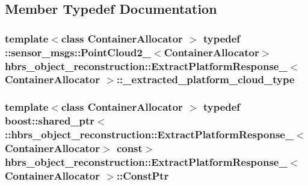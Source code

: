 \subsection{\-Member \-Typedef \-Documentation}
\hypertarget{structhbrs__object__reconstruction_1_1_extract_platform_response___a56a71ac31222bb75042448fdcaaf0e9a}{
\subsubsection[{\-\_\-extracted\-\_\-platform\-\_\-cloud\-\_\-type}]{\setlength{\rightskip}{0pt plus 5cm}template$<$class Container\-Allocator $>$ typedef \-::sensor\-\_\-msgs\-::\-Point\-Cloud2\-\_\-$<$\-Container\-Allocator$>$ {\bf hbrs\-\_\-object\-\_\-reconstruction\-::\-Extract\-Platform\-Response\-\_\-}$<$ \-Container\-Allocator $>$\-::{\bf \-\_\-extracted\-\_\-platform\-\_\-cloud\-\_\-type}}}\label{structhbrs__object__reconstruction_1_1_extract_platform_response___a56a71ac31222bb75042448fdcaaf0e9a}
\hypertarget{structhbrs__object__reconstruction_1_1_extract_platform_response___a8f2d74204a95c1817d4e69f026590159}{
\subsubsection[{\-Const\-Ptr}]{\setlength{\rightskip}{0pt plus 5cm}template$<$class Container\-Allocator $>$ typedef boost\-::shared\-\_\-ptr$<$ \-::{\bf hbrs\-\_\-object\-\_\-reconstruction\-::\-Extract\-Platform\-Response\-\_\-}$<$\-Container\-Allocator$>$ const$>$ {\bf hbrs\-\_\-object\-\_\-reconstruction\-::\-Extract\-Platform\-Response\-\_\-}$<$ \-Container\-Allocator $>$\-::{\bf \-Const\-Ptr}}}\label{structhbrs__object__reconstruction_1_1_extract_platform_response___a8f2d74204a95c1817d4e69f026590159}
